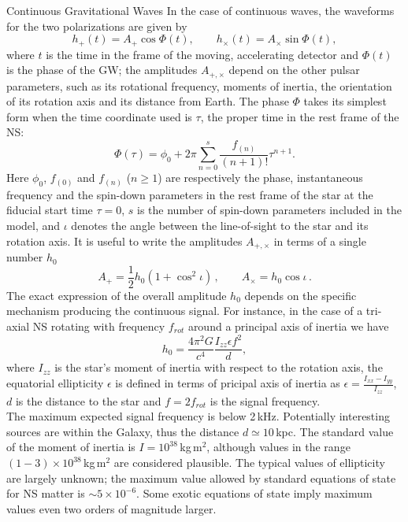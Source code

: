 {Continuous Gravitational Waves}
{In the case of continuous waves, the waveforms for the two polarizations 
are given by
%
\begin{equation}
  \label{eq:2}
  h_+(t) = A_+\cos\Phi(t), \qquad  h_\times(t) = A_\times\sin\Phi(t),
\end{equation}
%
where $t$ is the time in the frame of the moving, accelerating
detector and $\Phi(t)$ is the phase of the GW; the 
amplitudes $A_{+,\times}$ depend on the other pulsar parameters, 
such as its rotational frequency, moments of inertia, the orientation of 
its rotation axis and its distance from Earth. The phase $\Phi$ takes 
its simplest form when the time coordinate used is $\tau$, the proper 
time in the rest frame of the NS:
%
\begin{equation}
  \label{eq:3}
  \Phi(\tau) = \phi_0 + 2\pi \sum_{n=0}^{s}
  \frac{f_{(n)}}{(n+1)!} \tau^{n+1}.
\end{equation}
%
Here $\phi_0$, $f_{(0)}$ and $f_{(n)}$ ($n\geq 1$)
are respectively the phase, instantaneous frequency and the spin-down
parameters in the rest frame of the star at the fiducial start time
$\tau=0$, $s$ is the number of spin-down parameters included in
the model, and $\iota$ denotes the angle between the line-of-sight to the
star and its rotation axis. It is useful to write the amplitudes
$A_{+,\times}$ in terms of a single number $h_0$
\begin{equation}
  \label{eq:1}
  A_+ = \frac{1}{2}h_0(1+\cos^2\iota) \,,\qquad A_\times = h_0\cos\iota\,.
\end{equation}
The exact expression of the overall amplitude $h_0$ depends on the specific mechanism producing the continuous signal. For instance, in the case of a tri-axial NS rotating with frequency $f_{rot}$ around a principal axis of inertia we have
\begin{equation}
h_0=\frac{4\pi^2G}{c^4}\frac{I_{zz}\epsilon f^2}{d},
\end{equation}
where $I_{zz}$ is the star's moment of inertia with respect to the rotation axis, 
the equatorial ellipticity $\epsilon$ is defined in terms of pricipal axis 
of inertia as $\epsilon=\frac{I_{xx}-I_{yy}}{I_{zz}}$, $d$ is the distance 
to the star and $f=2f_{rot}$ is the signal frequency.
\\[5pt]
The maximum expected signal frequency is below 2\,kHz. Potentially 
interesting sources are within the Galaxy, thus the distance $d\simeq 10$\,kpc. 
The standard value of the moment of inertia is $I= 10^{38}$\,kg\,m$^2$, 
although values in the range $(1-3)\times 10^{38}$\,kg\,m$^2$ are 
considered plausible. The typical values of ellipticity are largely 
unknown; the maximum value allowed by standard equations of state for 
NS matter is $\sim 5\times 10^{-6}$. Some exotic 
equations of state imply maximum values even two orders of magnitude 
larger.
}

